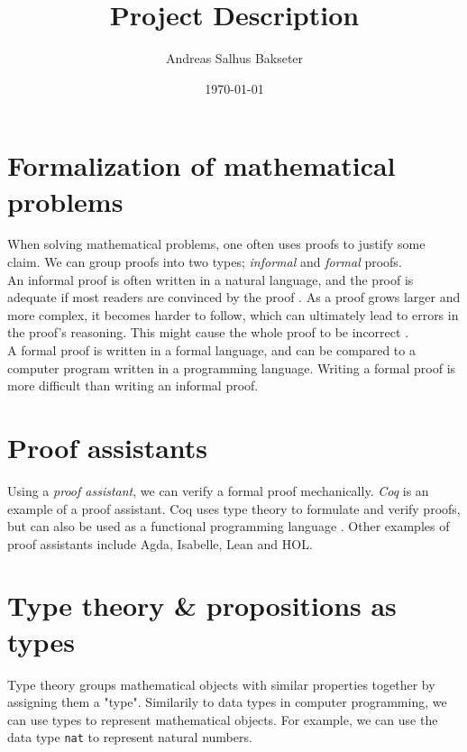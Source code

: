 \documentclass[a4paper,12pt]{article}
\title{\textbf{Project Description}}
\author{Andreas Salhus Bakseter}
\date{\today}
\begin{document}
\maketitle

\section{Formalization of mathematical problems}

When solving mathematical problems, one often uses proofs
to justify some claim. We can group proofs into two types; \textit{informal} and \textit{formal} proofs.
\\

An informal proof is often written in a natural language, and the proof is adequate if most
readers are convinced by the proof \cite{bpierce}.
As a proof grows larger and more complex, it becomes harder to follow, which can
ultimately lead to errors in the proof's reasoning. This might cause the whole proof
to be incorrect \cite{rkhamsi}.
\\

A formal proof is written in a formal language, and can be compared to a computer program
written in a programming language. Writing a formal proof is more difficult than writing an informal proof.


\section{Proof assistants}

Using a \textit{proof assistant}, we can verify a formal proof mechanically.
\textit{Coq} is an example of a proof assistant. 
Coq uses type theory to formulate and verify proofs, but can also be used as a functional programming language \cite{cintro}.
Other examples of proof assistants include Agda, Isabelle, Lean and HOL.

\newpage

\section{Type theory \& propositions as types}

Type theory groups mathematical objects with similar properties together by assigning them a "type".
Similarily to data types in computer programming, we can use types to represent mathematical
objects. For example, we can use the data type \texttt{nat} to represent natural numbers.
\\
\end{document}
